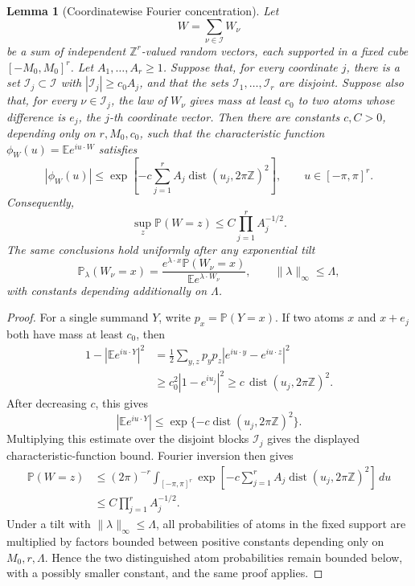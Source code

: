 \documentclass[11pt]{article}
\newtheorem{lemma}[theorem]{Lemma}
\theoremstyle{remark}
\newcommand{\Pp}{\mathbb P}
\newcommand{\Ee}{\mathbb E}
\newcommand{\dd}{\,d}
\begin{document}
\begin{lemma}[Coordinatewise Fourier concentration]\label{lem:coord-fourier}
Let
\[
        W=\sum_{\nu\in\mathcal I}W_\nu
\]
be a sum of independent \(\mathbb Z^r\)-valued random vectors, each supported in a fixed cube \([-M_0,M_0]^r\).  Let
\(A_1,\ldots,A_r\ge1\).  Suppose that, for every coordinate \(j\), there is a set
\(\mathcal I_j\subset\mathcal I\) with
\(|\mathcal I_j|\ge c_0A_j\), and that the sets
\(\mathcal I_1,\ldots,\mathcal I_r\) are disjoint.  Suppose also that, for every
\(\nu\in\mathcal I_j\), the law of \(W_\nu\) gives mass at least \(c_0\) to two atoms whose difference is \(e_j\), the \(j\)-th coordinate vector.  Then there are constants
\(c,C>0\), depending only on \(r,M_0,c_0\), such that the characteristic function
\(\phi_W(u)=\Ee e^{iu\cdot W}\) satisfies
\[
        |\phi_W(u)|
        \le \exp\left[-c\sum_{j=1}^r
        A_j\operatorname{dist}(u_j,2\pi\mathbb Z)^2\right],
        \qquad u\in[-\pi,\pi]^r.
\]
Consequently,
\[
        \sup_z\Pp(W=z)\le C\prod_{j=1}^r A_j^{-1/2}.
\]
The same conclusions hold uniformly after any exponential tilt
\[
        \Pp_\lambda(W_\nu=x)
        =\frac{e^{\lambda\cdot x}\Pp(W_\nu=x)}
        {\Ee e^{\lambda\cdot W_\nu}},
        \qquad \|\lambda\|_\infty\le \Lambda,
\]
with constants depending additionally on \(\Lambda\).
\end{lemma}

\begin{proof}
For a single summand \(Y\), write \(p_x=\Pp(Y=x)\).  If two atoms
\(x\) and \(x+e_j\) both have mass at least \(c_0\), then
\[
\begin{aligned}
        1-|\Ee e^{iu\cdot Y}|^2
        &=\frac12\sum_{y,z}p_yp_z
        |e^{iu\cdot y}-e^{iu\cdot z}|^2  \\
        &\ge c_0^2 |1-e^{iu_j}|^2
        \ge c\,\operatorname{dist}(u_j,2\pi\mathbb Z)^2 .
\end{aligned}
\]
After decreasing \(c\), this gives
\[
        |\Ee e^{iu\cdot Y}|
        \le \exp\{-c\operatorname{dist}(u_j,2\pi\mathbb Z)^2\}.
\]
Multiplying this estimate over the disjoint blocks \(\mathcal I_j\) gives the displayed characteristic-function bound.  Fourier inversion then gives
\[
\begin{aligned}
        \Pp(W=z)
        &\le (2\pi)^{-r}\int_{[-\pi,\pi]^r}
        \exp\left[-c\sum_{j=1}^r
        A_j\operatorname{dist}(u_j,2\pi\mathbb Z)^2\right]\dd u \\
        &\le C\prod_{j=1}^r A_j^{-1/2}.
\end{aligned}
\]
Under a tilt with \(\|\lambda\|_\infty\le\Lambda\), all probabilities of atoms in the fixed support are multiplied by factors bounded between positive constants depending only on \(M_0,r,\Lambda\).  Hence the two distinguished atom probabilities remain bounded below, with a possibly smaller constant, and the same proof applies.
\end{proof}
\end{document}
